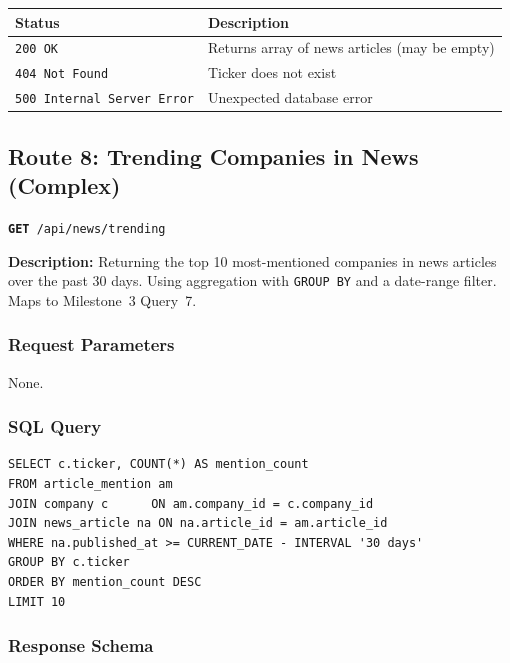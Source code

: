\documentclass[11pt]{article}
\newcommand{\route}[2]{\texttt{\textcolor{routecolor}{\textbf{#1}}~#2}}
\begin{document}
\begin{center}
\small
\begin{tabular}{l p{8cm}}
\toprule
\textbf{Status} & \textbf{Description} \\
\midrule
\texttt{200 OK} & Returns array of news articles (may be empty) \\
\texttt{404 Not Found} & Ticker does not exist \\
\texttt{500 Internal Server Error} & Unexpected database error \\
\bottomrule
\end{tabular}
\end{center}

\newpage
\subsection{Route 8: Trending Companies in News (Complex)}

\route{GET}{/api/news/trending}

\medskip\noindent
\textbf{Description:} Returning the top 10 most-mentioned companies in news articles over the past 30 days. Using aggregation with \texttt{GROUP BY} and a date-range filter. Maps to Milestone~3 Query~7.

\subsubsection*{Request Parameters}

None.

\subsubsection*{SQL Query}
\begin{lstlisting}[style=sql,basicstyle=\ttfamily\scriptsize]
SELECT c.ticker, COUNT(*) AS mention_count
FROM article_mention am
JOIN company c      ON am.company_id = c.company_id
JOIN news_article na ON na.article_id = am.article_id
WHERE na.published_at >= CURRENT_DATE - INTERVAL '30 days'
GROUP BY c.ticker
ORDER BY mention_count DESC
LIMIT 10
\end{lstlisting}

\subsubsection*{Response Schema}
\end{document}
